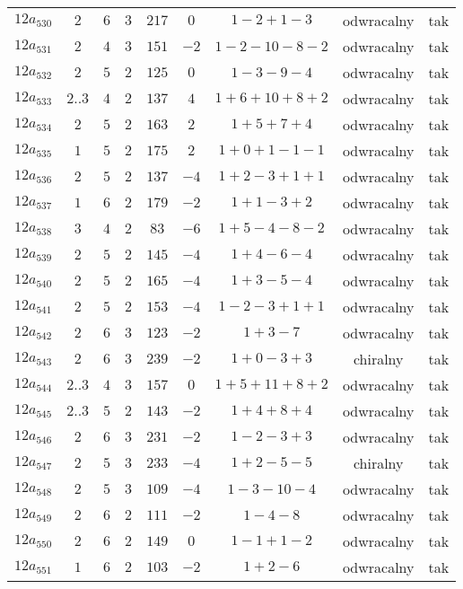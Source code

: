 \begin{longtable}{ccccccccc}
$12a_{530}$ & $2$ & $6$ & $3$ & $217$ & $0$ & $1-2+1-3$ & odwracalny & tak \\
$12a_{531}$ & $2$ & $4$ & $3$ & $151$ & $-2$ & $1-2-10-8-2$ & odwracalny & tak \\
$12a_{532}$ & $2$ & $5$ & $2$ & $125$ & $0$ & $1-3-9-4$ & odwracalny & tak \\
$12a_{533}$ & $2..3$ & $4$ & $2$ & $137$ & $4$ & $1+6+10+8+2$ & odwracalny & tak \\
$12a_{534}$ & $2$ & $5$ & $2$ & $163$ & $2$ & $1+5+7+4$ & odwracalny & tak \\
$12a_{535}$ & $1$ & $5$ & $2$ & $175$ & $2$ & $1+0+1-1-1$ & odwracalny & tak \\
$12a_{536}$ & $2$ & $5$ & $2$ & $137$ & $-4$ & $1+2-3+1+1$ & odwracalny & tak \\
$12a_{537}$ & $1$ & $6$ & $2$ & $179$ & $-2$ & $1+1-3+2$ & odwracalny & tak \\
$12a_{538}$ & $3$ & $4$ & $2$ & $83$ & $-6$ & $1+5-4-8-2$ & odwracalny & tak \\
$12a_{539}$ & $2$ & $5$ & $2$ & $145$ & $-4$ & $1+4-6-4$ & odwracalny & tak \\
$12a_{540}$ & $2$ & $5$ & $2$ & $165$ & $-4$ & $1+3-5-4$ & odwracalny & tak \\
$12a_{541}$ & $2$ & $5$ & $2$ & $153$ & $-4$ & $1-2-3+1+1$ & odwracalny & tak \\
$12a_{542}$ & $2$ & $6$ & $3$ & $123$ & $-2$ & $1+3-7$ & odwracalny & tak \\
$12a_{543}$ & $2$ & $6$ & $3$ & $239$ & $-2$ & $1+0-3+3$ & chiralny & tak \\
$12a_{544}$ & $2..3$ & $4$ & $3$ & $157$ & $0$ & $1+5+11+8+2$ & odwracalny & tak \\
$12a_{545}$ & $2..3$ & $5$ & $2$ & $143$ & $-2$ & $1+4+8+4$ & odwracalny & tak \\
$12a_{546}$ & $2$ & $6$ & $3$ & $231$ & $-2$ & $1-2-3+3$ & odwracalny & tak \\
$12a_{547}$ & $2$ & $5$ & $3$ & $233$ & $-4$ & $1+2-5-5$ & chiralny & tak \\
$12a_{548}$ & $2$ & $5$ & $3$ & $109$ & $-4$ & $1-3-10-4$ & odwracalny & tak \\
$12a_{549}$ & $2$ & $6$ & $2$ & $111$ & $-2$ & $1-4-8$ & odwracalny & tak \\
$12a_{550}$ & $2$ & $6$ & $2$ & $149$ & $0$ & $1-1+1-2$ & odwracalny & tak \\
$12a_{551}$ & $1$ & $6$ & $2$ & $103$ & $-2$ & $1+2-6$ & odwracalny & tak \\

\end{longtable}
